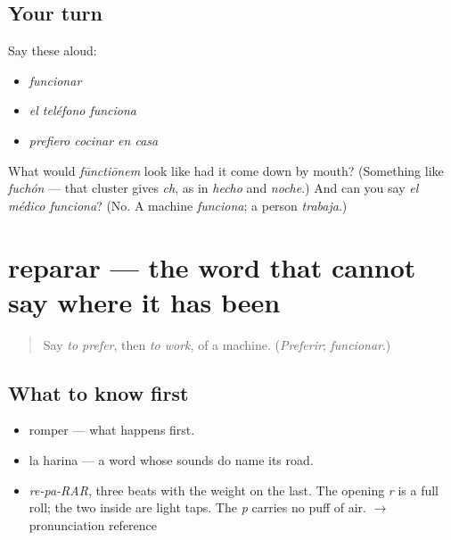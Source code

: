 \subsection*{Your turn}
Say these aloud:

\begin{itemize}
\raggedright
  \item \emph{funcionar}
  \item \emph{el teléfono funciona}
  \item \emph{prefiero cocinar en casa}
\end{itemize}

\begin{tcolorbox}[breakable,colback=teal!4,colframe=teal!35!black,title={Before you move on}]
What would \emph{fūnctiōnem} look like had it come down by mouth? (Something like \emph{fuchón} — that cluster gives \emph{ch}, as in \emph{hecho} and \emph{noche}.) And can you say \emph{el médico funciona}? (No. A machine \emph{funciona}; a person \emph{trabaja}.)
\end{tcolorbox}
\section[reparar]{reparar — the word that cannot say where it has been}

\label{lesson:ES-C396-reparar}



\begin{quote}
Say \emph{to prefer}, then \emph{to work}, of a machine. (\emph{Preferir}; \emph{funcionar}.)
\end{quote}

\subsection*{What to know first}
\begin{itemize}
\raggedright
  \item romper — what happens first.
  \item la harina — a word whose sounds do name its road.
\end{itemize}

\begin{sounds}
\begin{itemize}
\raggedright
  \item \emph{re-pa-RAR}, three beats with the weight on the last. The opening \emph{r} is a full roll; the two inside are light taps. The \emph{p} carries no puff of air. $\to$ pronunciation reference
\end{itemize}
\end{sounds}

